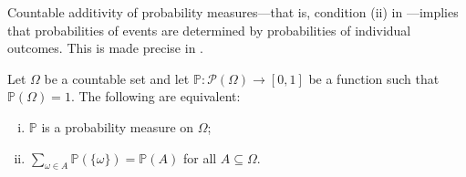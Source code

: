 Countable additivity of probability measures---that is, condition (ii) in ---implies that probabilities of events are determined by probabilities of individual outcomes. This is made precise in .

\begin{proposition}
\label{propEquivalentSecondAxiomsForDiscreteProbabilitySpace}
Let $\Omega$ be a countable set and let $\mathbb{P} : \mathcal{P}(\Omega) \to [0,1]$ be a function such that $\mathbb{P}(\Omega)=1$. The following are equivalent:
\begin{enumerate}[(i)]
\item $\mathbb{P}$ is a probability measure on $\Omega$;
\item $\sum_{\omega \in A} \mathbb{P}(\{\omega\}) = \mathbb{P}(A)$ for all $A \subseteq \Omega$.
\end{enumerate}
\end{proposition}


